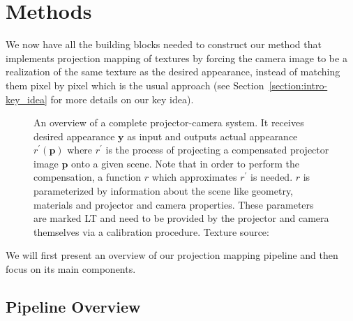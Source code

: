 \chapter{Methods}
\label{chapter:methods}

We now have all the building blocks needed to construct our method that implements projection mapping of textures by forcing the camera image to be a realization of the same texture as the desired appearance, instead of matching them pixel by pixel which is the usual approach (see Section~\ref{section:intro-key_idea} for more details on our key idea).

\begin{figure}[t]
    \centering
    \def\svgwidth{0.8\textwidth}
    
    \caption{An overview of a complete projector-camera system. It receives desired appearance \(\bm{y}\) as input and outputs actual appearance \(r^\prime(\bm{p})\) where \(r^{\prime}\) is the process of projecting a compensated projector image \(\bm{p}\) onto a given scene. Note that in order to perform the compensation, a function \(r\) which approximates \(r^\prime\) is needed. \(r\) is parameterized by information about the scene like geometry, materials and projector and camera properties. These parameters are marked LT and need to be provided by the projector and camera themselves via a calibration procedure. Texture source: \citet{Pixar128}}
    \label{fig:methods_system}
\end{figure}

We will first present an overview of our projection mapping pipeline and then focus on its main components.

\section{Pipeline Overview}
\label{section:methods-pipeline_overview}


